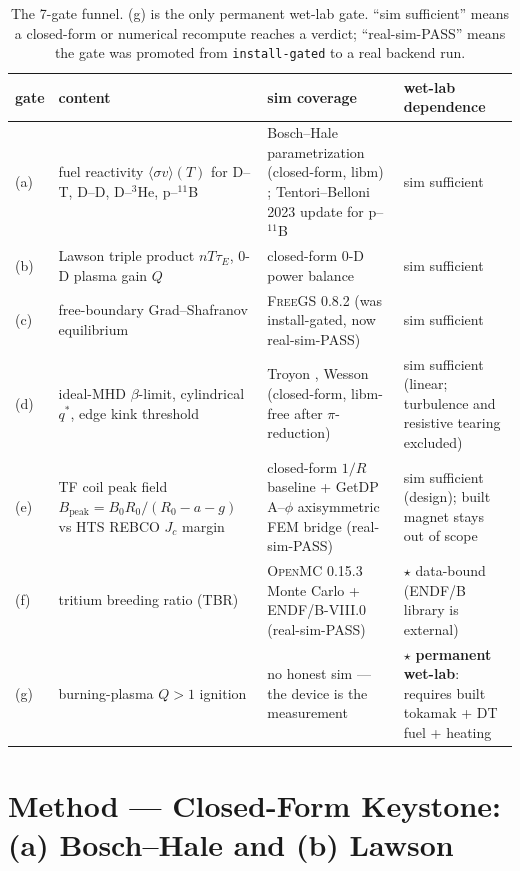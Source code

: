 \documentclass[11pt,a4paper]{article}
\begin{document}
\begin{table}[h]
\centering
\small
\setlength{\tabcolsep}{4pt}
\begin{tabular}{@{}>{\centering\arraybackslash}m{0.5cm}p{4.0cm}p{4.4cm}p{3.5cm}@{}}
\toprule
gate & content & sim coverage & wet-lab dependence \\
\midrule
(a) & fuel reactivity $\langle\sigma v\rangle(T)$ for D--T, D--D, D--$^3$He, p--$^{11}$B & Bosch--Hale parametrization (closed-form, libm) \citep{boschhale1992}; Tentori--Belloni 2023 update for p--$^{11}$B \citep{tentori2023pb11} & sim sufficient \\
(b) & Lawson triple product $n T \tau_{\!E}$, 0-D plasma gain $Q$ & closed-form 0-D power balance \citep{lawson1957} & sim sufficient \\
(c) & free-boundary Grad--Shafranov equilibrium & \textsc{FreeGS} 0.8.2 \citep{freegs} (was install-gated, now real-sim-PASS) & sim sufficient \\
(d) & ideal-MHD $\beta$-limit, cylindrical $q^{*}$, edge kink threshold & Troyon \citep{troyon1984}, Wesson \citep{wesson2011tokamaks} (closed-form, libm-free after $\pi$-reduction) & sim sufficient (linear; turbulence and resistive tearing excluded) \\
(e) & TF coil peak field $B_{\text{peak}}\!=\!B_0 R_0/(R_0\!-\!a\!-\!g)$ vs HTS REBCO $J_{\!c}$ margin & closed-form $1/R$ baseline + GetDP A--$\phi$ axisymmetric FEM bridge \citep{getdp} (real-sim-PASS) & sim sufficient (design); built magnet stays out of scope \\
(f) & tritium breeding ratio (TBR) & \textsc{OpenMC} 0.15.3 Monte Carlo \citep{romano2015openmc} + ENDF/B-VIII.0 \citep{brown2018endf} (real-sim-PASS) & $\star$ data-bound (ENDF/B library is external) \\
(g) & burning-plasma $Q\!>\!1$ ignition & no honest sim --- the device is the measurement & $\star$ \textbf{permanent wet-lab}: requires built tokamak + DT fuel + heating \\
\bottomrule
\end{tabular}
\caption{The 7-gate funnel. (g) is the only permanent wet-lab gate.
``sim sufficient'' means a closed-form or numerical recompute reaches a
verdict; ``real-sim-PASS'' means the gate was promoted from
\texttt{install-gated} to a real backend run.}
\label{tab:gates}
\end{table}

\section{Method --- Closed-Form Keystone: (a) Bosch--Hale and (b) Lawson}
\label{sec:keystone}
\end{document}
